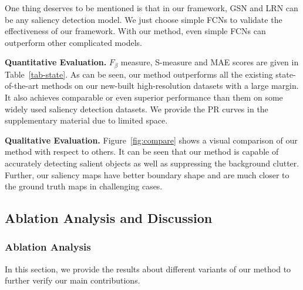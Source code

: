 \documentclass[10pt,twocolumn,letterpaper]{article}
\begin{document}
One thing deserves to be mentioned is that in our framework, GSN and LRN can be any saliency detection model.
We just choose simple FCNs to validate the effectiveness of our framework. With our method, even simple FCNs can outperform other complicated models.

\textbf{Quantitative Evaluation.}
$F_\beta$ measure, S-measure and MAE scores are given in Table~\ref{tab-state}. As can be seen, our method outperforms all the existing state-of-the-art methods on our new-built high-resolution datasets with a large margin. It also achieves comparable or even superior performance than them on some widely used saliency detection datasets. We provide the PR curves in the supplementary material due to limited space.

\textbf{Qualitative Evaluation.} Figure~\ref{fig:compare} shows a visual comparison of our method with respect to others. It can be seen that our method is capable of accurately detecting salient objects as well as suppressing the background clutter. Further, our saliency maps have better boundary shape and are much closer to the ground truth maps in challenging cases.
\subsection{ Ablation Analysis and Discussion}
\subsubsection{Ablation Analysis}
In this section, we provide the results about different variants of our method to further verify our main contributions.
\end{document}
